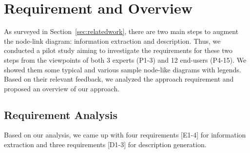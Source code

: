 \section{Requirement and Overview}\label{sec:pilotstudy}

As surveyed in Section~\ref{sec:relatedwork}, there are two main steps to augment the node-link diagram: information extraction and description. Thus, we conducted a pilot study aiming to investigate the requirements for these two steps from the viewpoints of both 3 experts (P1-3) and 12 end-users (P4-15). We showed them some typical and various sample node-like diagrams with legends. Based on their relevant feedback, we analyzed the approach requirement and proposed an overview of our approach.

\subsection{Requirement Analysis}

Based on our analysis, we came up with four requirements [E1-4] for information extraction and three requirements [D1-3] for description generation.


